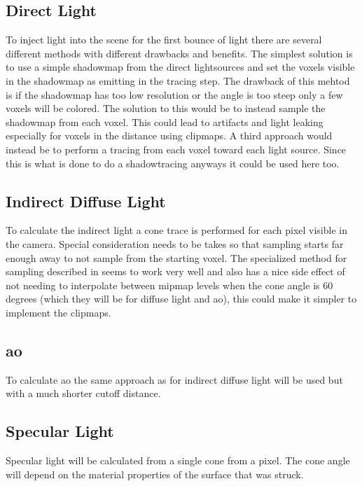 \documentclass[a4paper, 12pt]{article}
\begin{document}
\subsection{Direct Light}

To inject light into the scene for the first bounce of light there are several different methods with different drawbacks and benefits. The simplest solution is to use a simple shadowmap from the direct lightsources and set the voxels visible in the shadowmap as emitting in the tracing step. The drawback of this mehtod is if the shadowmap has too low resolution or the angle is too steep only a few voxels will be colored. The solution to this would be to instead sample the shadowmap from each voxel. This could lead to artifacts and light leaking especially for voxels in the distance using clipmaps. A third approach would instead be to perform a tracing from each voxel toward each light source. Since this is what is done to do a shadowtracing anyways it could be used here too.

\subsection{Indirect Diffuse Light}

To calculate the indirect light a cone trace is performed for each pixel visible in the camera. Special consideration needs to be takes so that sampling starts far enough away to not sample from the starting voxel. The specialized method for sampling described in \cite{phdthesis} seems to work very well and also has a nice side effect of not needing to interpolate between mipmap levels when the cone angle is 60 degrees (which they will be for diffuse light and \gls{ao}), this could make it simpler to implement the clipmaps.

\subsection{\acrlong{ao}}

To calculate \gls{ao} the same approach as for indirect diffuse light will be used but with a much shorter cutoff distance.

\subsection{Specular Light}

Specular light will be calculated from a single cone from a pixel. The cone angle will depend on the material properties of the surface that was struck.
\end{document}
